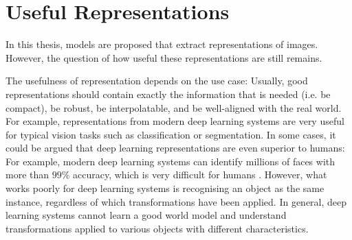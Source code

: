 

\section{Useful Representations}
In this thesis, models are proposed that extract representations of images.
However, the question of how useful these representations are still remains.

The usefulness of representation depends on the use case: Usually, good representations should contain exactly the information that is needed (i.e. be compact), be robust, be interpolatable, and be well-aligned with the real world.
For example, representations from modern deep learning systems are very useful for typical vision tasks such as classification or segmentation. In some cases, it could be argued that deep learning representations are even superior to humans: For example, modern deep learning systems  can identify millions of faces with more than $99\%$ accuracy, which is very difficult for humans . 
However, what works poorly for deep learning systems is recognising an object as the same instance, regardless of which transformations have been applied. In general, deep learning systems cannot learn a good world model and understand transformations applied to various objects with different characteristics.

